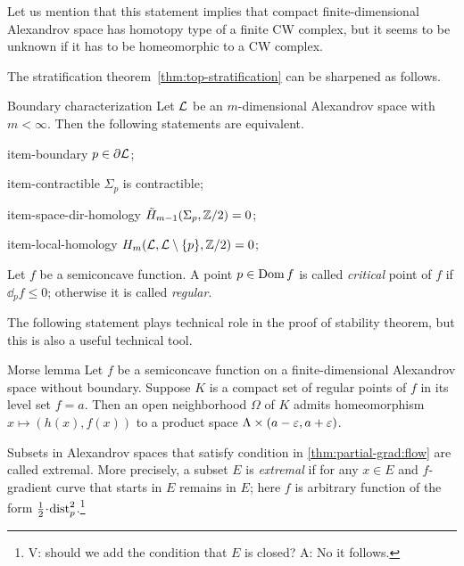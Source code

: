 Let us mention that this statement implies that compact finite-dimensional Alexandrov space has homotopy type of a finite CW complex,
but it seems to be unknown if it has to be homeomorphic to a CW complex.

The stratification theorem~\ref{thm:top-stratification} can be sharpened as follows.

\begin{thm}{Boundary characterization}
Let $\mathcal{L}$ be an $m$-dimensional Alexandrov space with $m<\infty$.
Then the following statements are equivalent.

\begin{subthm}{item-boundary} $p\in \partial \mathcal{L}$;
\end{subthm}

\begin{subthm}{item-contractible} $\Sigma_p$ is contractible;
\end{subthm}

\begin{subthm}{item-space-dir-homology} $\tilde H_{m-1}(\Sigma_p,\mathbb{Z}/2)= 0$;
\end{subthm}

\begin{subthm}{item-local-homology} $H_m(\mathcal{L},\mathcal{L}\setminus \{p\},\mathbb{Z}/2)= 0$;
\end{subthm}

\end{thm}

Let $f$ be a semiconcave function.
A point $p\in \mathop{\rm Dom}\nolimits f$ is called \emph{critical} point of $f$ if $\dd_pf\le 0$; 
otherwise it is called \emph{regular}.

The following statement plays technical role in the proof of stability theorem,
but this is also a useful technical tool.

\begin{thm}{Morse lemma}
Let $f$ be a semiconcave function on a finite-dimensional Alexandrov space without boundary.
Suppose $K$ is a compact set of regular points of $f$ in its level set $f=a$.
Then an open neighborhood $\Omega$ of $K$ admits homeomorphism $x\mapsto (h(x),f(x))$ to a product space $\Lambda\times (a-\varepsilon,a+\varepsilon)$.
\end{thm}

Subsets in Alexandrov spaces that satisfy condition in \ref{thm:partial-grad:flow} are called extremal.
More precisely, a subset $E$ is \emph{extremal} if for any $x\in E$
and $f$-gradient curve that starts in $E$ remains in $E$;
here $f$ is arbitrary function of the form $\tfrac12\cdot \distfun_p^2$.\footnote{ {\red V: should we add the condition that $E$ is closed?} A: No it follows.}

